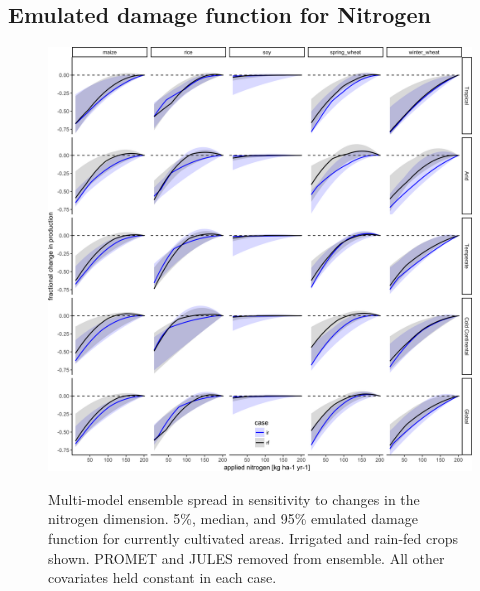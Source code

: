 \documentclass[10pt]{article}
\begin{document}
\subsection{Emulated damage function for Nitrogen}
\begin{figure}[h!]
\includegraphics[width=\textwidth]{s_nitrogen.png}\\
\caption{Multi-model ensemble spread in sensitivity to changes in the nitrogen dimension. 5\%, median, and 95\% emulated damage function for currently cultivated areas. Irrigated and rain-fed crops shown. PROMET and JULES removed from ensemble. All other covariates held constant in each case.}
\label{fig:nitrogen}
\end{figure}
\clearpage
\end{document}
